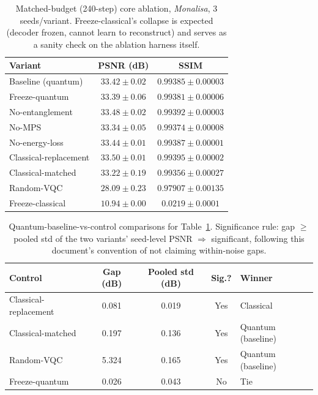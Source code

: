\documentclass[11pt]{article}
\begin{document}
\begin{table}[H]
\centering
\caption{Matched-budget (240-step) core ablation, \textit{Monalisa}, 3 seeds/variant. Freeze-classical's collapse is expected (decoder frozen, cannot learn to reconstruct) and serves as a sanity check on the ablation harness itself.}
\label{tab:core_multiseed_240}
\scriptsize
\begin{tabular}{lcc}
\toprule
Variant & PSNR (dB) & SSIM \\
\midrule
Baseline (quantum) & $33.42\pm0.02$ & $0.99385\pm0.00003$ \\
Freeze-quantum & $33.39\pm0.06$ & $0.99381\pm0.00006$ \\
No-entanglement & $33.48\pm0.02$ & $0.99392\pm0.00003$ \\
No-MPS & $33.34\pm0.05$ & $0.99374\pm0.00008$ \\
No-energy-loss & $33.44\pm0.01$ & $0.99387\pm0.00001$ \\
Classical-replacement & $33.50\pm0.01$ & $0.99395\pm0.00002$ \\
Classical-matched & $33.22\pm0.19$ & $0.99356\pm0.00027$ \\
Random-VQC & $28.09\pm0.23$ & $0.97907\pm0.00135$ \\
Freeze-classical & $10.94\pm0.00$ & $0.0219\pm0.0001$ \\
\bottomrule
\end{tabular}
\end{table}

\begin{table}[H]
\centering
\caption{Quantum-baseline-vs-control comparisons for Table~\ref{tab:core_multiseed_240}. Significance rule: gap $\geq$ pooled std of the two variants' seed-level PSNR $\Rightarrow$ significant, following this document's convention of not claiming within-noise gaps.}
\label{tab:core_multiseed_240_stats}
\scriptsize
\begin{tabular}{lcccl}
\toprule
Control & Gap (dB) & Pooled std (dB) & Sig.? & Winner \\
\midrule
Classical-replacement & 0.081 & 0.019 & Yes & Classical \\
Classical-matched & 0.197 & 0.136 & Yes & Quantum (baseline) \\
Random-VQC & 5.324 & 0.165 & Yes & Quantum (baseline) \\
Freeze-quantum & 0.026 & 0.043 & No & Tie \\
\bottomrule
\end{tabular}
\end{table}
\end{document}
